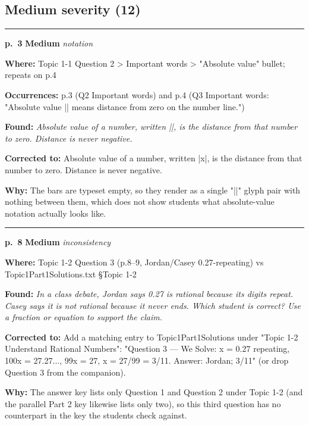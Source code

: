 \documentclass[11pt]{article}
\newcommand{\sevmed}[1]{\textcolor{orange!80!black}{\textbf{#1}}}
\begin{document}
\subsection*{Medium severity (12)}
\noindent\rule{\textwidth}{0.4pt}\par\nobreak\vspace{2pt}
\noindent\textbf{p.~3} \quad \sevmed{Medium} \quad \textit{notation}\par
\noindent\textbf{Where: }Topic 1-1 Question 2 > Important words > "Absolute value" bullet; repeats on p.4\par
\noindent\textbf{Occurrences: }p.3 (Q2 Important words) and p.4 (Q3 Important words: "Absolute value || means distance from zero on the number line.")\par
\noindent\textbf{Found: }\textit{Absolute value of a number, written ||, is the distance from that number to zero. Distance is never negative.}\par
\noindent\textbf{Corrected to: }Absolute value of a number, written |x|, is the distance from that number to zero. Distance is never negative.\par
\noindent\textbf{Why: }The bars are typeset empty, so they render as a single "||" glyph pair with nothing between them, which does not show students what absolute-value notation actually looks like.\par\vspace{4pt}
\noindent\rule{\textwidth}{0.4pt}\par\nobreak\vspace{2pt}
\noindent\textbf{p.~8} \quad \sevmed{Medium} \quad \textit{inconsistency}\par
\noindent\textbf{Where: }Topic 1-2 Question 3 (p.8--9, Jordan/Casey 0.27-repeating) vs Topic1Part1Solutions.txt §Topic 1-2\par
\noindent\textbf{Found: }\textit{In a class debate, Jordan says 0.27 is rational because its digits repeat. Casey says it is not rational because it never ends. Which student is correct? Use a fraction or equation to support the claim.}\par
\noindent\textbf{Corrected to: }Add a matching entry to Topic1Part1Solutions under "Topic 1-2 Understand Rational Numbers": "Question 3 --- We Solve: x = 0.27 repeating, 100x = 27.27..., 99x = 27, x = 27/99 = 3/11. Answer: Jordan; 3/11" (or drop Question 3 from the companion).\par
\noindent\textbf{Why: }The answer key lists only Question 1 and Question 2 under Topic 1-2 (and the parallel Part 2 key likewise lists only two), so this third question has no counterpart in the key the students check against.\par\vspace{4pt}
\end{document}
